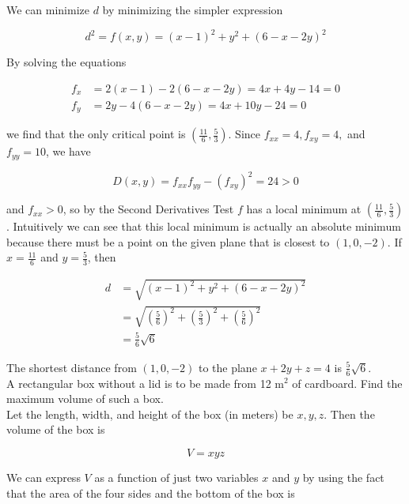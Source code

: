        We can minimize $d$ by minimizing the simpler expression

        \[
            d^2 = f(x,y) = (x-1)^2 + y^2 + (6-x-2y)^2
        \]

        By solving the equations

        \begin{align*}
            f_x &= 2(x-1) - 2(6 - x - 2y) = 4x + 4y - 14 = 0 \\
            f_y &= 2y - 4(6 - x - 2y) = 4x + 10y - 24 = 0
        \end{align*}

        we find that the only critical point is $\left(\frac{11}{6}, \frac{5}{3}\right)$. Since $f_{xx} = 4, f_{xy} = 4,$ and $f_{yy} = 10$, we have

        \[
            D(x,y) = f_{xx} f_{yy} - \left(f_{xy}\right)^2 = 24 > 0
        \]

        and $f_{xx} > 0$, so by the Second Derivatives Test $f$ has a local minimum at $\left(\frac{11}{6}, \frac{5}{3}\right)$. Intuitively we can see that this local minimum is actually an absolute minimum because
        there must be a point on the given plane that is closest to $(1,0,-2)$. If $x = \frac{11}{6}$ and $y=\frac{5}{3}$, then

        \begin{align*}
            d   &= \sqrt{(x-1)^2 + y^2 + (6 - x - 2y)^2} \\
                &= \sqrt{\left(\frac{5}{6}\right)^2 + \left(\frac{5}{3}\right)^2 + \left(\frac{5}{6}\right)^2} \\
                &= \frac{5}{6}\sqrt{6}
        \end{align*}

        The shortest distance from $(1,0,-2)$ to the plane $x + 2y + z = 4$ is $\frac{5}{6}\sqrt{6}$. \\

        \textit{} A rectangular box without a lid is to be made from 12 $\text{m}^2$ of cardboard. Find the maximum volume of such a box. \\

        Let the length, width, and height of the box (in meters) be $x,y,z$. Then the volume of the box is

        \[
            V = xyz
        \]

        We can express $V$ as a function of just two variables $x$ and $y$ by using the fact that the area of the four sides and the bottom of the box is

